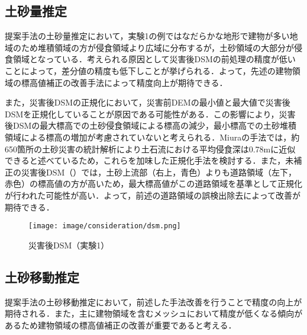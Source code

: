     \subsection*{土砂量推定}
      提案手法の土砂量推定において，実験1の例ではなだらかな地形で建物が多い地域のため堆積領域の方が侵食領域より広域に分布するが，土砂領域の大部分が侵食領域となっている．考えられる原因として災害後DSMの前処理の精度が低いことによって，差分値の精度も低下しことが挙げられる．よって，先述の建物領域の標高値補正の改善手法によって精度向上が期待できる．
      
      また，災害後DSMの正規化において，災害前DEMの最小値と最大値で災害後DSMを正規化していることが原因である可能性がある．この影響により，災害後DSMの最大標高での土砂侵食領域による標高の減少，最小標高での土砂堆積領域による標高の増加が考慮されていないと考えられる．Miuraの手法\cite{土砂量解析5}では，約650箇所の土砂災害の統計解析により土石流における平均侵食深は0.78mに近似できると述べているため，これらを加味した正規化手法を検討する．また，未補正の災害後DSM（）では，土砂上流部（右上，青色）よりも道路領域（左下，赤色）の標高値の方が高いため，最大標高値がこの道路領域を基準として正規化が行われた可能性が高い．よって，前述の道路領域の誤検出除去によって改善が期待できる．
      
      \begin{figure}[tbp]
        \centering
        \texttt{[image: image/consideration/dsm.png]}
        \caption{災害後DSM（実験1）}
        \label{災害後DSM（実験1）}
      \end{figure}


    \subsection*{土砂移動推定}
      提案手法の土砂移動推定において，前述した手法改善を行うことで精度の向上が期待される．また，主に建物領域を含むメッシュにおいて精度が低くなる傾向があるため建物領域の標高値補正の改善が重要であると考える．
